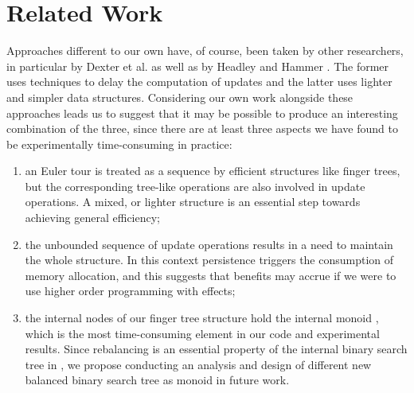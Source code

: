 \section{Related Work} 
\label{sec:RelWrk} 

Approaches different to our own have, of course, been taken by other researchers, in particular by Dexter et al. \cite{Lazy-Gproc-Haskell} as well as by Headley and Hammer \cite{RAZ}. The former uses techniques to delay the computation of updates and the latter uses lighter and simpler data structures. Considering our own work alongside these approaches leads us to suggest that it may be possible to produce an interesting combination of the three, since there are at least three aspects we have found to be experimentally time-consuming in practice:

\begin{enumerate}
\item an Euler tour is treated as a sequence by efficient structures like finger trees, but the corresponding tree-like operations are also involved in update operations. A mixed, or lighter structure is an essential step towards achieving general efficiency;

\item the unbounded sequence of update operations results in a need to maintain the whole structure. In this context persistence triggers the consumption of memory allocation, and this suggests that benefits may accrue if we were to use higher order programming with effects;

\item the internal nodes of our finger tree structure hold the internal monoid , which is the most time-consuming element in our code and experimental results. Since rebalancing is an essential property of the internal binary search tree in , we propose conducting an analysis and design of different new balanced binary search tree as monoid in future work.
\end{enumerate}
